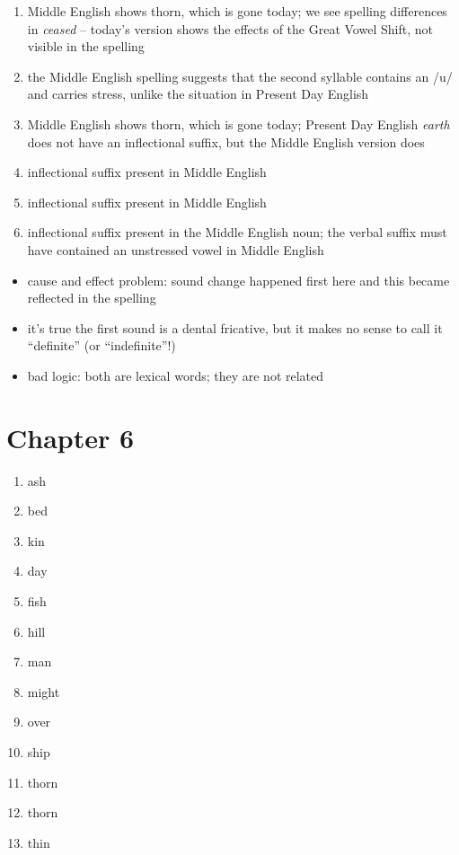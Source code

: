 \noindent\textbf{}
\begin{enumerate}
    \item Middle English shows thorn, which is gone today; we see spelling differences in \textit{ceased} -- today's version shows the effects of the Great Vowel Shift, not visible in the spelling
    \item the Middle English spelling suggests that the second syllable contains an /u/ and carries stress, unlike the situation in Present Day English
    \item Middle English shows thorn, which is gone today; Present Day English \textit{earth} does not have an inflectional suffix, but the Middle English version does
    \item inflectional suffix present in Middle English
    \item inflectional suffix present in Middle English
    \item inflectional suffix present in the Middle English noun; the verbal suffix must have contained an unstressed vowel in Middle English
\end{enumerate}

\noindent\textbf{}

\noindent 
\begin{itemize}
    \item cause and effect problem: sound change happened first here and this became reflected in the spelling
    \item it's true the first sound is a dental fricative, but it makes no sense to call it ``definite'' (or ``indefinite''!)
    \item bad logic: both are lexical words; they are not related
\end{itemize}

\newpage
\section*{Chapter 6}

\noindent\textbf{}
\begin{multicols}{2}
\begin{enumerate}
  \item ash
  \item bed
  \item kin
  \item day
  \item fish
  \item hill
  \item man
  \item might
  \item over
  \item ship
  \item thorn
  \item thorn
  \item thin
\end{enumerate}
\end{multicols}

